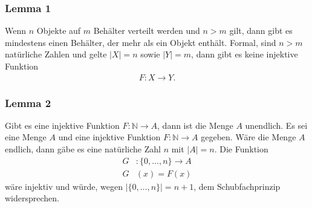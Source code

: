 \begin{minipage}{0.9\linewidth}
	\subsubsection{Lemma 1}%
	\label{ssub:lemma_1}
	Wenn $n$ Objekte auf $m$ Behälter verteilt werden und $n>m$ gilt, dann gibt es mindestens einen Behälter, der mehr als ein Objekt enthält. Formal, sind $n>m$ natürliche Zahlen und gelte $|X|= n$ sowie $|Y|=m$, dann gibt es keine injektive Funktion
	\begin{align*}
		F: X\to Y.
	\end{align*}
\end{minipage}

\begin{minipage}{0.9\linewidth}
	\subsubsection{Lemma 2}%
	\label{ssub:lemma_2}
	Gibt es eine injektive Funktion $F:\mathbb{N}\to A$, dann ist die Menge $A$ unendlich.
	Es sei eine Menge $A$ und eine injektive Funktion $F:\mathbb{N}\to A$ gegeben. Wäre die Menge $A$ endlich, dann gäbe es eine natürliche Zahl $n$ mit $|A|=n$. Die Funktion
	\begin{align*}
		G & :\{0,\dots,n\}\to A \\
		G & (x) = F(x)
	\end{align*}
	wäre injektiv und würde, wegen $|\{0,\dots,n\}|=n+1$, dem Schubfachprinzip widersprechen.
\end{minipage}

